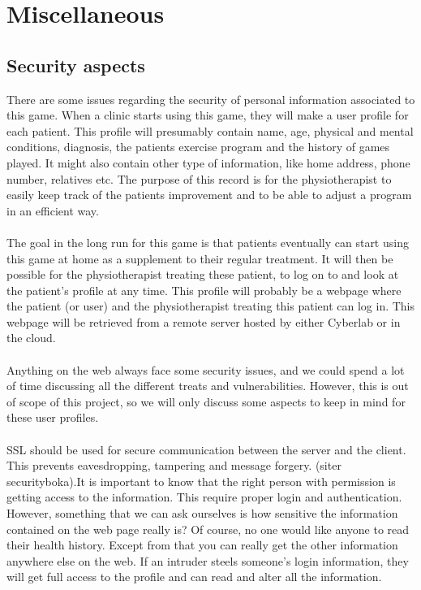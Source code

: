 \chapter{Miscellaneous}
\section{Security aspects}
There are some issues regarding the security of personal information associated to this game. When a clinic starts using this game, they will make a user profile for each patient. This profile will presumably contain name, age, physical and mental conditions, diagnosis, the patients exercise program and the history of games played. It might also contain other type of information, like home address, phone number, relatives etc. The purpose of this record is for the physiotherapist to easily keep track of the patients improvement and to be able to adjust a program in an efficient way. \\ \\
The goal in the long run for this game is that patients eventually can start using this game at home as a supplement to their regular treatment. It will then be possible for the physiotherapist treating these patient, to log on to and look at the patient’s profile at any time. This profile will probably be a webpage where the patient (or user) and the physiotherapist treating this patient can log in. This webpage will be retrieved from a remote server hosted by either Cyberlab or in the cloud. \\ \\
Anything on the web always face some security issues, and we could spend a lot of time discussing all the different treats and vulnerabilities. However, this is out of scope of this project, so we will only discuss some aspects to keep in mind for these user profiles.\\ \\
SSL should be used for secure communication between the server and the client. This prevents eavesdropping, tampering and message forgery. (siter securityboka).It is important to know that the right person with permission is getting access to the information. This require proper login and authentication. However, something that we can ask ourselves is how sensitive the information contained on the web page really is? Of course, no one would like anyone to read their health history. Except from that you can really get the other information anywhere else on the web. If an intruder steels someone's login information, they will get full access to the profile and can read and alter all the information.  \\ \\
